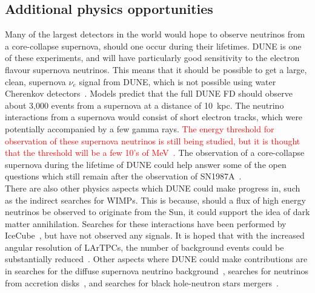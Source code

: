 \subsection{Additional physics opportunities} \label{sec:DUNE_Other}%
Many of the largest detectors in the world would hope to observe neutrinos from a core-collapse supernova, should one occur during their lifetimes. DUNE is one of these experiments, and will have particularly good sensitivity to the electron flavour supernova neutrinos. This means that it should be possible to get a large, clean, supernova $\nu_e$ signal from DUNE, which is not possible using water Cherenkov detectors~\citep{KScholSND, Laha:2013hva}. Models predict that the full DUNE FD should observe about 3,000 events from a supernova at a distance of 10~kpc. The neutrino interactions from a supernova would consist of short electron tracks, which were potentially accompanied by a few gamma rays. \textcolor{red}{The energy threshold for observation of these supernova neutrinos is still being studied, but it is thought that the threshold will be a few 10's of MeV~\citep{DUNECDR_V2}.} The observation of a core-collapse supernova during the lifetime of DUNE could help answer some of the open questions which still remain after the observation of SN1987A~\citep{PhysRevLett.58.1494, PhysRevLett.58.1490}. \\

There are also other physics aspects which DUNE could make progress in, such as the indirect searches for WIMPs. This is because, should a flux of high energy neutrinos be observed to originate from the Sun, it could support the idea of dark matter annihilation. Searches for these interactions have been performed by IceCube~\citep{Aartsen:2012kia, Choi:2015ara}, but have not observed any signals. It is hoped that with the increased angular resolution of LArTPCs, the number of background events could be substantially reduced~\citep{DUNECDR_V2}. Other aspects where DUNE could make contributions are in searches for the diffuse supernova neutrino background~\citep{Beacom:2010kk}, searches for neutrinos from accretion disks~\citep{Caballero:2011dw}, and searches for black hole-neutron stars mergers~\citep{Caballero:2009ww}. \\

